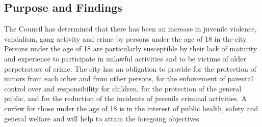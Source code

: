\subsection{Purpose and Findings}
The Council has determined that there has been an increase in juvenile violence, vandalism, gang activity and crime by persons under the age of 18 in the city.  Persons under the age of 18 are particularly susceptible by their lack of maturity and experience to participate in unlawful activities and to be victims of older perpetrators of crime.  The city has an obligation to provide for the protection of minors from each other and from other persons, for the enforcement of parental control over and responsibility for children, for the protection of the general public, and for the reduction of the incidents of juvenile criminal activities.  A curfew for those under the age of 18 is in the interest of public health, safety and general welfare and will help to attain the foregoing objectives.

